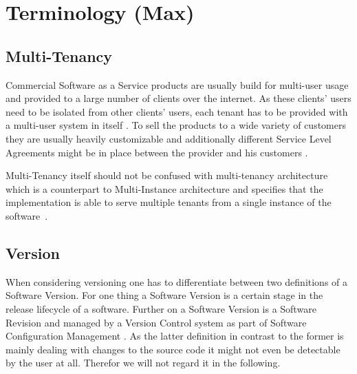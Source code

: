 \section{Terminology (Max)}
\label{sec:terminology}

\subsection{Multi-Tenancy}

Commercial Software as a Service products are usually build for multi-user usage and provided to a large number of clients over the internet. As these clients' users need to be isolated from other clients' users, each tenant has to be provided with a multi-user system in itself \cite{Chong2006a}. To sell the products to a wide variety of customers they are usually heavily customizable and additionally different Service Level Agreements might be in place between the provider and his customers \cite{Bezemer2010}.

Multi-Tenancy itself should not be confused with multi-tenancy architecture which is a counterpart to Multi-Instance architecture and specifies that the implementation is able to serve multiple tenants from a single instance of the software~\cite{Shao2011}.

\subsection{Version}

When considering versioning one has to differentiate between two definitions of a Software Version.
For one thing a Software Version is a certain stage in the release lifecycle of a software.
Further on a Software Version is a Software Revision and managed by a Version Control system as part of Software Configuration Management \cite{swebook}.
As the latter definition in contrast to the former is mainly dealing with changes to the source code it might not even be detectable by the user at all.
Therefor we will not regard it in the following.


